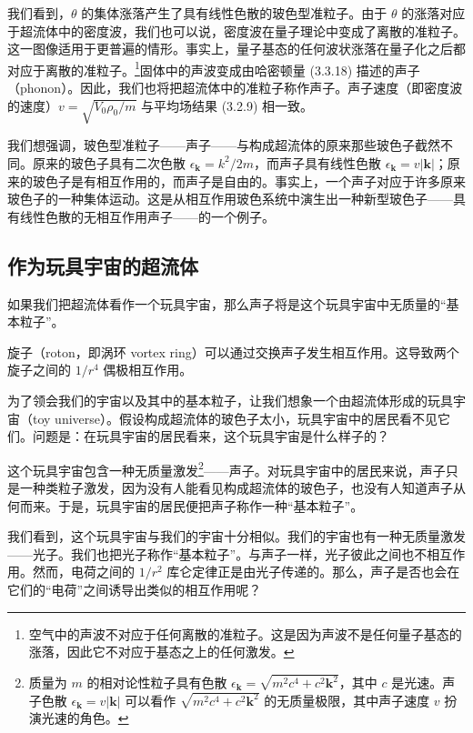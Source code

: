 我们看到，$\theta$ 的集体涨落产生了具有线性色散的玻色型准粒子。由于 $\theta$ 的涨落对应于超流体中的密度波，我们也可以说，密度波在量子理论中变成了离散的准粒子。这一图像适用于更普遍的情形。事实上，量子基态的任何波状涨落在量子化之后都对应于离散的准粒子。\footnote{空气中的声波不对应于任何离散的准粒子。这是因为声波不是任何量子基态的涨落，因此它不对应于基态之上的任何激发。}固体中的声波变成由哈密顿量 (3.3.18) 描述的声子（phonon）。因此，我们也将把超流体中的准粒子称作声子。声子速度（即密度波的速度）$v = \sqrt{V_0\rho_0/m}$ 与平均场结果 (3.2.9) 相一致。

我们想强调，玻色型准粒子——声子——与构成超流体的原来那些玻色子截然不同。原来的玻色子具有二次色散 $\epsilon_{\pmb{k}} = k^2/2m$，而声子具有线性色散 $\epsilon_{\pmb{k}} = v|\pmb{k}|$；原来的玻色子是有相互作用的，而声子是自由的。事实上，一个声子对应于许多原来玻色子的一种集体运动。这是从相互作用玻色系统中演生出一种新型玻色子——具有线性色散的无相互作用声子——的一个例子。

\subsection{作为玩具宇宙的超流体}

\begin{keypoints}
\item 如果我们把超流体看作一个玩具宇宙，那么声子将是这个玩具宇宙中无质量的“基本粒子”。
\item 旋子（roton，即涡环 vortex ring）可以通过交换声子发生相互作用。这导致两个旋子之间的 $1/r^4$ 偶极相互作用。
\end{keypoints}

为了领会我们的宇宙以及其中的基本粒子，让我们想象一个由超流体形成的玩具宇宙（toy universe）。假设构成超流体的玻色子太小，玩具宇宙中的居民看不见它们。问题是：在玩具宇宙的居民看来，这个玩具宇宙是什么样子的？


这个玩具宇宙包含一种无质量激发\footnote{质量为 $m$ 的相对论性粒子具有色散 $\epsilon_{\pmb{k}} = \sqrt{m^2c^4 + c^2\pmb{k}^2}$，其中 $c$ 是光速。声子色散 $\epsilon_{\pmb{k}} = v|\pmb{k}|$ 可以看作 $\sqrt{m^2c^4 + c^2\pmb{k}^2}$ 的无质量极限，其中声子速度 $v$ 扮演光速的角色。}——声子。对玩具宇宙中的居民来说，声子只是一种类粒子激发，因为没有人能看见构成超流体的玻色子，也没有人知道声子从何而来。于是，玩具宇宙的居民便把声子称作一种“基本粒子”。

我们看到，这个玩具宇宙与我们的宇宙十分相似。我们的宇宙也有一种无质量激发——光子。我们也把光子称作“基本粒子”。与声子一样，光子彼此之间也不相互作用。然而，电荷之间的 $1/r^2$ 库仑定律正是由光子传递的。那么，声子是否也会在它们的“电荷”之间诱导出类似的相互作用呢？

